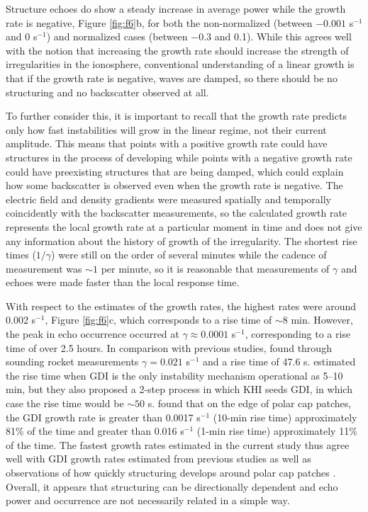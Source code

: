 Structure echoes do show a steady increase in average power while the growth rate is negative, Figure \ref{fig:f6}b, for both the non-normalized (between \(-0.001\) s\(^{-1}\) and 0  s\(^{-1}\)) and normalized cases (between \(-0.3\) and 0.1).  While this agrees well with the notion that increasing the growth rate should increase the strength of irregularities in the ionosphere, conventional understanding of a linear growth is that if the growth rate is negative, waves are damped, so there should be no structuring and no backscatter observed at all.

To further consider this, it is important to recall that the growth rate predicts only how fast instabilities will grow in the linear regime, not their current amplitude.  This means that points with a positive growth rate could have structures in the process of developing while points with a negative growth rate could have preexisting structures that are being damped, which could explain how some backscatter is observed even when the growth rate is negative.  The electric field and density gradients were measured spatially and temporally coincidently with the backscatter measurements, so the calculated growth rate represents the local growth rate at a particular moment in time and does not give any information about the history of growth of the irregularity.  The shortest rise times (\(1/\gamma\)) were still on the order of several minutes while the cadence of measurement was \(\sim1\) per minute, so it is reasonable that measurements of \(\gamma\) and echoes were made faster than the local response time.

With respect to the estimates of the growth rates, the highest rates were around 0.002 s\(^{-1}\), Figure \ref{fig:f6}c, which corresponds to a rise time of \(\sim8\) min.  However, the peak in echo occurrence occurred at \(\gamma\approx0.0001\) s\(^{-1}\), corresponding to a rise time of over 2.5 hours. In comparison with previous studies, \citet{Moe12} found through sounding rocket measurements \(\gamma = 0.021\) s\(^{-1}\) and a rise time of 47.6 s.  \citet{Carlson2007} estimated the rise time when GDI is the only instability mechanism operational as 5--10 min, but they also proposed a 2-step process in which KHI seeds GDI, in which case the rise time would be \(\sim50\) s.  \citet{Burston2016} found that on the edge of polar cap patches, the GDI growth rate is greater than 0.0017 s\(^{-1}\) (10-min rise time) approximately 81\% of the time and greater than 0.016 s\(^{-1}\) (1-min rise time) approximately 11\% of the time. The fastest growth rates estimated in the current study thus agree well with GDI growth rates estimated from previous studies as well as observations of how quickly structuring develops around polar cap patches \citep{Carlson2007}.  Overall, it appears that structuring can be directionally dependent and echo power and occurrence are not necessarily related in a simple way.



